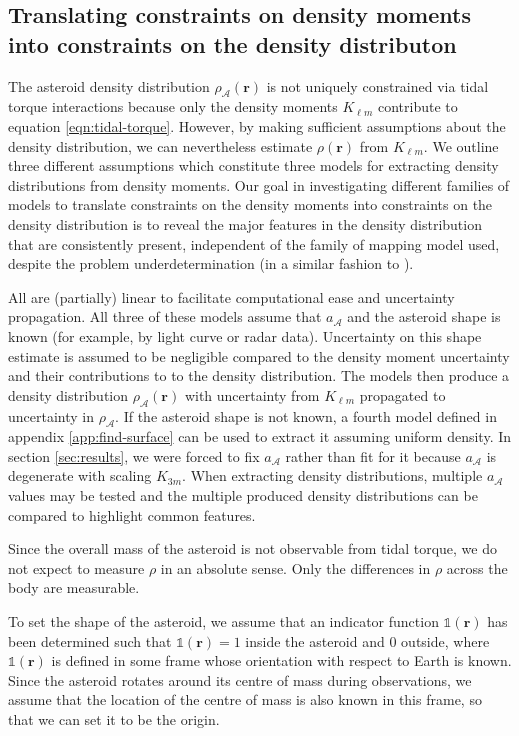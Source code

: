 

\subsection{Translating constraints on density moments into constraints on the density distributon}
\label{sec:density-distro}

The asteroid density distribution $\rho_\mathcal{A}(\bm r)$ is not uniquely constrained via tidal torque interactions because only the density moments $K_{\ell m}$ contribute to equation \ref{eqn:tidal-torque}. However, by making sufficient assumptions about the density distribution, we can nevertheless estimate $\rho(\bm r)$ from $K_{\ell m}$. We outline three different assumptions which constitute three models for extracting density distributions from density moments. 
Our goal in investigating different families of models to translate constraints on the density moments into constraints on the density distribution is to reveal the major features in the density distribution that are consistently present, independent of the family of mapping model used, despite the problem underdetermination (in a similar fashion to \cite{de2012towards}).

All are (partially) linear to facilitate computational ease and uncertainty propagation. All three of these models assume that $a_\mathcal{A}$ and the asteroid shape is known (for example, by light curve or radar data). Uncertainty on this shape estimate is assumed to be negligible compared to the density moment uncertainty and their contributions to to the density distribution. The models then produce a density distribution $\rho_\mathcal{A}(\bm r)$ with uncertainty from $K_{\ell m}$ propagated to uncertainty in $\rho_\mathcal{A}$. If the asteroid shape is not known, a fourth model defined in appendix \ref{app:find-surface} can be used to extract it assuming uniform density. In section \ref{sec:results}, we were forced to fix $a_\mathcal{A}$ rather than fit for it because $a_\mathcal{A}$ is degenerate with scaling $K_{3m}$. When extracting density distributions, multiple $a_\mathcal{A}$ values may be tested and the multiple produced density distributions can be compared to highlight common features.

Since the overall mass of the asteroid is not observable from tidal torque, we do not expect to measure $\rho$ in an absolute sense. Only the differences in $\rho$ across the body are measurable.

To set the shape of the asteroid, we assume that an indicator function $\mathds{1}(\bm r)$ has been determined such that $\mathds{1}(\bm r) = 1$ inside the asteroid and 0 outside, where $\mathds{1}(\bm r)$ is defined in some frame whose orientation with respect to Earth is known. Since the asteroid rotates around its centre of mass during observations, we assume that the location of the centre of mass is also known in this frame, so that we can set it to be the origin.

